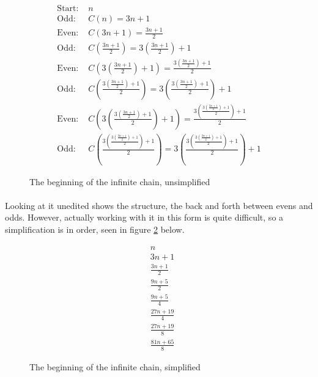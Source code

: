 \documentclass[12pt,letterpaper]{article}
\begin{document}
			\setcounter{equation}{0}
			\begin{figure}[h]
				\begin{align}
					\text{Start: }& n\\
					\text{Odd: }& C(n) = 3n+1\\
					\text{Even: }& C(3n+1) = \frac{3n+1}{2}\\
					\text{Odd: }& C\left(\frac{3n+1}{2}\right) = 3 \left(\frac{3n+1}{2}\right) + 1\\
					\text{Even: }& C\left(3 \left(\frac{3n+1}{2}\right) + 1\right) = \frac{3 \left(\frac{3n+1}{2}\right) + 1}{2}\\
					\text{Odd: }& C\left(\frac{3 \left(\frac{3n+1}{2}\right) + 1}{2}\right) = 3 \left(\frac{3 \left(\frac{3n+1}{2}\right) + 1}{2}\right) + 1\\
					\text{Even: }& C\left(3 \left(\frac{3 \left(\frac{3n+1}{2}\right) + 1}{2}\right) + 1\right) = \frac{3 \left(\frac{3 \left(\frac{3n+1}{2}\right) + 1}{2}\right) + 1}{2}\\
					\text{Odd: }& C\left(\frac{3 \left(\frac{3 \left(\frac{3n+1}{2}\right) + 1}{2}\right) + 1}{2}\right) = 3\left(\frac{3 \left(\frac{3 \left(\frac{3n+1}{2}\right) + 1}{2}\right) + 1}{2}\right) + 1
				\end{align}
				
				\caption{The beginning of the infinite chain, unsimplified}
				\label{chain:unsimplified}
			\end{figure}
			
			\newpage %
			
			\paragraph{} Looking at it unedited shows the structure, the back and forth between evens and odds. However, actually working with it in this form is quite difficult, so a simplification is in order, seen in figure \ref{chain:simplified} below.
			
			\setcounter{equation}{0}
			\begin{figure}[h]
				\begin{align}
					&n\\
					&3n+1\\
					&\frac{3n+1}{2}\\
					&\frac{9n+5}{2}\\
					&\frac{9n+5}{4}\\
					&\frac{27n+19}{4}\\
					&\frac{27n+19}{8}\\
					&\frac{81n+65}{8}
				\end{align}
				
				\caption{The beginning of the infinite chain, simplified}
				\label{chain:simplified}
			\end{figure}
		
\end{document}
